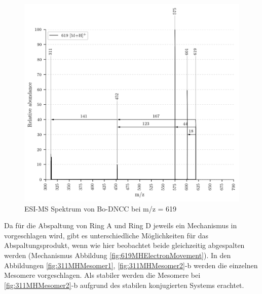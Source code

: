 \begin{figure}[!htbp]
  \centering
  \includegraphics[width=\textwidth, height=0.7\textwidth]{figures/Kapitel7/Kataboliten/VWA_MS_619.png}
  \caption[ESI-MS Spektrum von Bo-DNCC, Quelle: Author]{ESI-MS Spektrum von Bo-DNCC bei m/z = 619 }
  \label{fig:619MH}
\end{figure}

Da für die Abspaltung von Ring A und Ring D jeweils ein Mechanismus in \cite{StructureElucidation} vorgeschlagen wird, gibt es unterschiedliche Möglichkeiten für das Abspaltungsprodukt, wenn wie hier beobachtet beide gleichzeitig abgespalten werden (Mechanismus Abbildung \ref{fig:619MHElectronMovement}). In den Abbildungen \ref{fig:311MHMesomer1}, \ref{fig:311MHMesomer2}-b werden die einzelnen Mesomere vorgeschlagen. Als stabiler werden die Mesomere bei \ref{fig:311MHMesomer2}-b aufgrund des stabilen konjugierten Systems erachtet.

